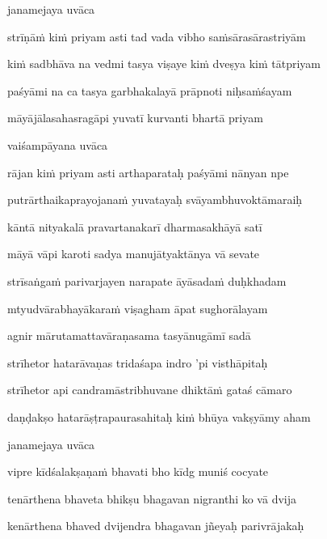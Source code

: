 janamejaya uvāca~{\dandab}\dontdisplaylinenum 

\nemsloka 
strīṇāṁ kiṁ priyam asti tad vada vibho saṁsārasārastriyām
\dontdisplaylinenum

\nemslokab 
kiṁ sadbhāva na vedmi tasya viṣaye kiṁ dveṣya kiṁ tātpriyam \danda\dontdisplaylinenum

\nemslokac 
paśyāmi na ca tasya garbhakalayā prāpnoti niḥsaṁśayam
\dontdisplaylinenum

\nemslokad 
māyājālasahasragāpi yuvatī kurvanti bhartā priyam \veg\dontdisplaylinenum

\vers

vaiśampāyana uvāca~{\dandab}\dontdisplaylinenum 

\nemsloka 
rājan kiṁ priyam asti arthaparataḥ paśyāmi nānyan npe
\dontdisplaylinenum

\nemslokab 
putrārthaikaprayojanaṁ yuvatayaḥ svāyambhuvoktāmaraiḥ \danda\dontdisplaylinenum

\nemslokac 
kāntā nityakalā pravartanakarī dharmasakhāyā satī
\dontdisplaylinenum

\nemslokad 
māyā vāpi karoti sadya manujātyaktānya vā sevate \veg\dontdisplaylinenum

\ujvers\nemsloka 
strīsaṅgaṁ parivarjayen narapate āyāsadaṁ duḥkhadam
\dontdisplaylinenum

\nemslokab 
mtyudvārabhayākaraṁ viṣagham āpat sughorālayam \danda\dontdisplaylinenum

\nemslokac 
agnir mārutamattavāraṇasama tasyānugāmī sadā
\dontdisplaylinenum

\nemslokad 
strīhetor hatarāvaṇas tridaśapa indro 'pi visthāpitaḥ \veg\dontdisplaylinenum

\ujvers\nemsloka 
strīhetor api candramāstribhuvane dhiktāṁ gataś cāmaro
\dontdisplaylinenum

\nemslokad 
daṇḍakṣo hatarāṣṭrapaurasahitaḥ kiṁ bhūya vakṣyāmy aham \veg\dontdisplaylinenum


\vers

janamejaya uvāca~{\dandab}\dontdisplaylinenum 

\nemsloka 
vipre kīdśalakṣaṇaṁ bhavati bho kīdg muniś cocyate
\dontdisplaylinenum

\nemslokab 
tenārthena bhaveta bhikṣu bhagavan nigranthi ko vā dvija \danda\dontdisplaylinenum

\nemslokac 
kenārthena bhaved dvijendra bhagavan jñeyaḥ parivrājakaḥ
\dontdisplaylinenum

